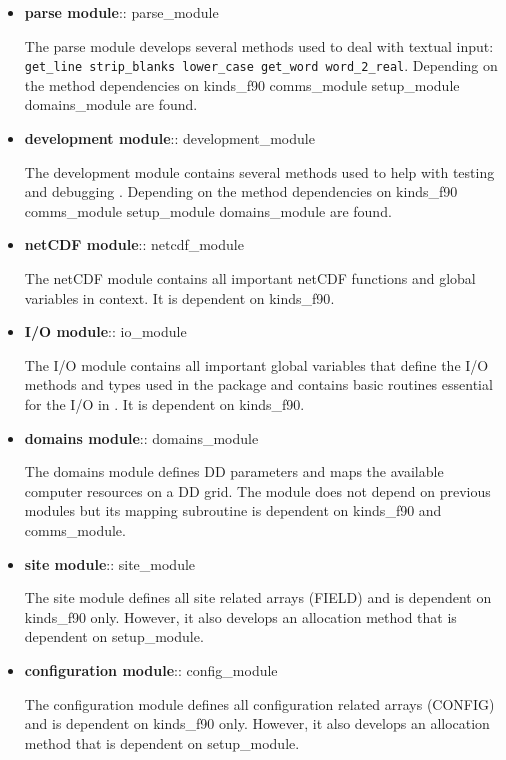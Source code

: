\begin{itemize}
\item {\bf parse module}:: {\sc parse\_module}

The parse module develops several methods used to deal with
textual input: {\tt get\_line strip\_blanks lower\_case get\_word
word\_2\_real}.  Depending on the method dependencies on
{\sc kinds\_f90 comms\_module setup\_module domains\_module} are found.

\item {\bf development module}:: {\sc development\_module}

The development module contains several methods used to help with
testing and debugging \D.  Depending on the method dependencies on
{\sc kinds\_f90 comms\_module setup\_module domains\_module} are found.

\item {\bf netCDF module}:: {\sc netcdf\_module}

The netCDF module contains all important netCDF functions and global
variables in \D context.  It is dependent on {\sc kinds\_f90}.

\item {\bf I/O module}:: {\sc io\_module}

The I/O module contains all important global variables that define
the I/O methods and types used in the package and contains
basic routines essential for the I/O in \D.  It is dependent on
{\sc kinds\_f90}.

\item {\bf domains module}:: {\sc domains\_module}

The domains module defines DD parameters and maps the available
computer resources on a DD grid.  The module does not depend on
previous modules but its mapping subroutine is dependent on
{\sc kinds\_f90} and {\sc comms\_module}.

\item {\bf site module}:: {\sc site\_module}

The site module defines all site related arrays (FIELD) and is
dependent on {\sc kinds\_f90} only.  However, it also develops an
allocation method that is dependent on {\sc setup\_module}.

\item {\bf configuration module}:: {\sc config\_module}

The configuration module defines all configuration related arrays
(CONFIG) and is dependent on {\sc kinds\_f90} only.  However, it
also develops an allocation method that is dependent on
{\sc setup\_module}.


\end{itemize}

